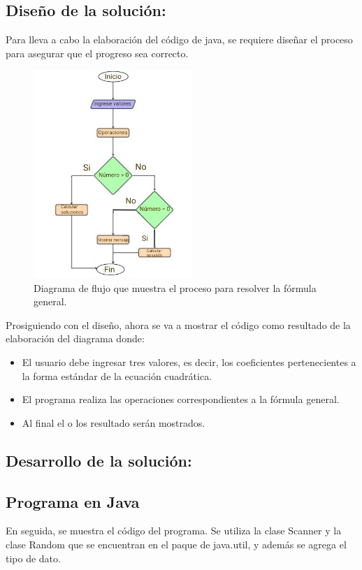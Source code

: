 \newline
\subsection{\textbf{Diseño de la solución:}}
Para lleva a cabo la elaboración del código de java, se requiere diseñar el proceso para asegurar que el progreso sea correcto.

\begin{figure}[H]
\centering
\includegraphics[width=6cm]{LaTeX/latex-imagenes/diagramaflujo.jpg}
\caption{Diagrama de flujo que muestra el proceso para resolver la fórmula general.}
\label{fig:diagrama_flujo}
\end{figure}

\newline

Prosiguiendo con el diseño, ahora se va a mostrar el código como resultado de la elaboración del diagrama donde:

\begin{itemize}
  \item El usuario debe ingresar tres valores, es decir, los coeficientes pertenecientes a la forma estándar de la ecuación cuadrática.
  \item El programa realiza las operaciones correspondientes a la fórmula general.
  \item Al final el o los resultado serán mostrados.
\end{itemize}
\subsection{\textbf{Desarrollo de la solución:}}
\subsection{Programa en Java}
En seguida, se muestra el código del programa.
Se utiliza la clase Scanner y la clase Random que se encuentran en el paque de java.util, y además se agrega el tipo de dato.

